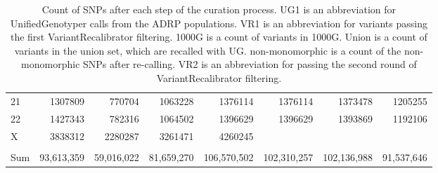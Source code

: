 \begin{table}[htbp]
{\begin{tabular}{l|r|r|r|r|r|r|r}
21 & 1307809 & 770704 & 1063228 & 1376114 & 1376114 & 1373478 & 1205255 \\
22 & 1427343 & 782316 & 1064502 & 1396629 & 1396629 & 1393869 & 1192106 \\
X & 3838312 & 2280287 & 3261471 & 4260245 &  &  &  \\
 &  &  &  &  &  &  &  \\
\hline
Sum & 93,613,359 & 59,016,022 & 81,659,270 & 106,570,502 & 102,310,257 & 102,136,988 & 91,537,646 \\
\end{tabular}
}
\caption[\gls{SNP} count after each \gls{ADRP} data curation step.]{Count of SNPs after each step of the curation process. UG1 is an abbreviation for UnifiedGenotyper calls from the ADRP populations. VR1 is an abbreviation for variants passing the first VariantRecalibrator filtering. 1000G is a count of variants in 1000G. Union is a count of variants in the union set, which are recalled with UG. non-monomorphic is a count of the non-monomorphic SNPs after re-calling. VR2 is an abbreviation for passing the second round of VariantRecalibrator filtering.}
\label{tab:SNPcount}
\end{table}